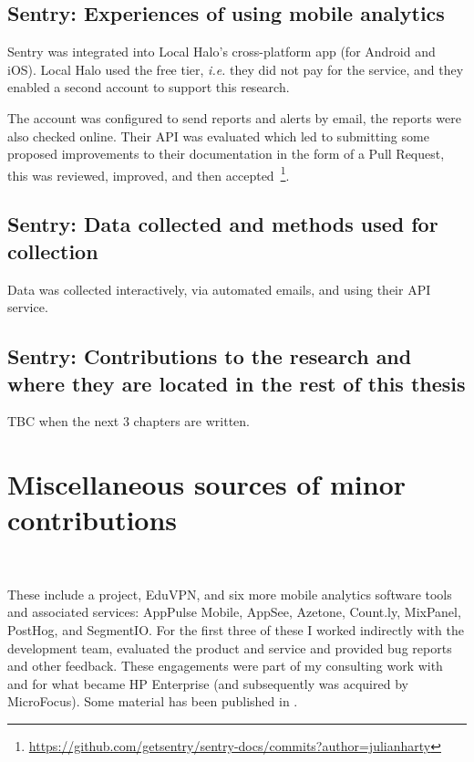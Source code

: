 \subsection{Sentry: Experiences of using mobile analytics}
Sentry was integrated into Local Halo's cross-platform app (for Android and iOS). Local Halo used the free tier, \emph{i.e.} they did not pay for the service, and they enabled a second account to support this research.

The account was configured to send reports and alerts by email, the reports were also checked online. Their API was evaluated which led to submitting some proposed improvements to their documentation in the form of a Pull Request, this was reviewed, improved, and then accepted~\footnote{\url{https://github.com/getsentry/sentry-docs/commits?author=julianharty}}.

\subsection{Sentry: Data collected and methods used for collection}

Data was collected interactively, via automated emails, and using their API service.

\subsection{Sentry: Contributions to the research and where they are located in the rest of this thesis}
TBC when the next 3 chapters are written.


\clearpage


\section{Miscellaneous sources of minor contributions}~\label{section-case-study-misc-contributions}

These include a project, EduVPN, and six more mobile analytics software tools and associated services: AppPulse Mobile, AppSee, Azetone, Count.ly, MixPanel, PostHog, and SegmentIO. For the first three of these I worked indirectly with the development team, evaluated the product and service and provided bug reports and other feedback. These engagements were part of my consulting work with and for what became HP Enterprise (and subsequently was acquired by MicroFocus). Some material has been published in .

